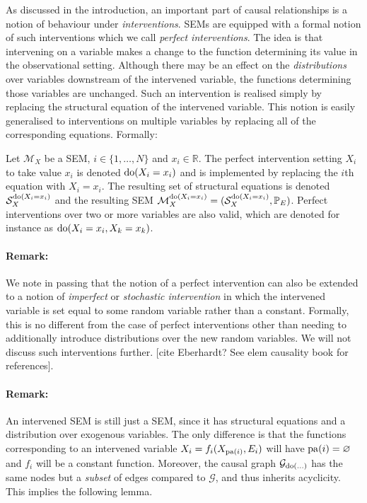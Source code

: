 As discussed in the introduction, an important part of causal relationships is a notion of behaviour under \emph{interventions}. SEMs are equipped with a formal notion of such interventions which we call \emph{perfect interventions}. The idea is that intervening on a variable makes a change to the function determining its value in the observational setting.  Although there may be an effect on the \emph{distributions} over variables downstream of the intervened variable, the functions determining those variables are unchanged. Such an intervention is realised simply by replacing the structural equation of the intervened variable. This notion is easily generalised to interventions on multiple variables by replacing all of the corresponding equations. Formally:

\begin{definition}
	Let $\mathcal{M}_X$ be a SEM, $i \in \{1,\ldots,N \}$ and $x_i \in \mathbb{R}$. The perfect intervention setting $X_i$ to take value $x_i$ is denoted $\operatorname{do}(X_i = x_i)$ and is implemented by replacing the $i$th equation with $X_i = x_i$. The resulting set of structural equations is denoted $\mathcal{S}_X^{\operatorname{do}(X_i=x_i)}$ and the resulting SEM $\mathcal{M}_X^{\operatorname{do}(X_i=x_i)} = (\mathcal{S}_X^{\operatorname{do}(X_i=x_i)}, \mathbb{P}_E)$.
	Perfect interventions over two or more variables are also valid, which are denoted for instance as $\operatorname{do}(X_i = x_i, X_k = x_k)$.
\end{definition}

\paragraph{Remark:} We note in passing that the notion of a perfect intervention can also be extended to a notion of \emph{imperfect} or \emph{stochastic intervention} in which the intervened variable is set equal to some random variable rather than a constant. Formally, this is no different from the case of perfect interventions other than needing to additionally introduce distributions over the new random variables. We will not discuss such interventions further. [cite Eberhardt? See elem causality book for references].

\paragraph{Remark:} An intervened SEM is still just a SEM, since it has structural equations and a distribution over exogenous variables. The only difference is that the functions corresponding to an intervened variable $X_i = f_i(X_{\operatorname{pa}(i)}, E_i)$ will have $\operatorname{pa}(i) = \varnothing$ and $f_i$ will be a constant function. Moreover, the causal graph $\mathcal{G}_{\operatorname{do}(\ldots)}$ has the same nodes but a \emph{subset} of edges compared to $\mathcal{G}$, and thus inherits acyclicity. This implies the following lemma.

